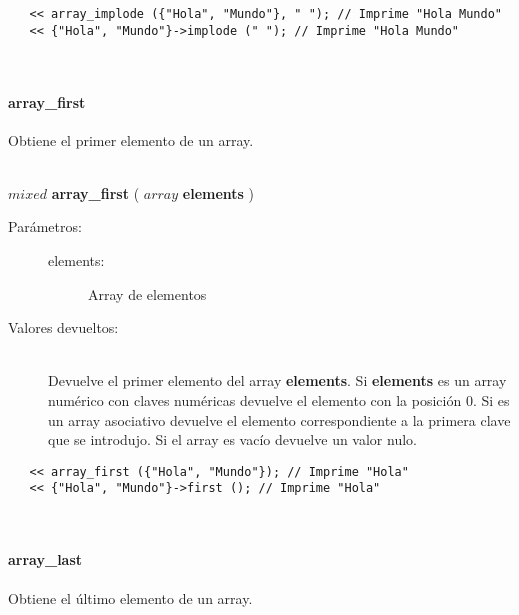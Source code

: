 \begin{lstlisting}   
   << array_implode ({"Hola", "Mundo"}, " "); // Imprime "Hola Mundo"
   << {"Hola", "Mundo"}->implode (" "); // Imprime "Hola Mundo"
\end{lstlisting}
\hfill\\ 

\paragraph{array\_first}
Obtiene el primer elemento de un array. 

\hfill \\ $mixed$ \textbf{array\_first} ( $array$ \textbf{elements} )  
\begin{description}
\item [Parámetros:] \hfill 
   \begin{description}
   \item[elements:] Array de elementos
   \end{description}
\item[Valores devueltos:] \hfill \\
   Devuelve el primer elemento del array \textbf{elements}. Si \textbf{elements} es un array
   numérico con claves numéricas devuelve el elemento con la posición 0. Si es un array asociativo 
   devuelve el elemento correspondiente a la primera clave que se introdujo. Si el array es vacío 
   devuelve un valor nulo. 
\end{description}
     
\begin{lstlisting}   
   << array_first ({"Hola", "Mundo"}); // Imprime "Hola"
   << {"Hola", "Mundo"}->first (); // Imprime "Hola"
\end{lstlisting}
\hfill\\ 

\paragraph{array\_last}
Obtiene el último elemento de un array. 

